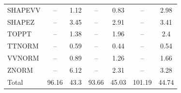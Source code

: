 \begin{table}[H]
\begin{center}
\begin{footnotesize}
\begin{tabular}{lcccccc}
				SHAPEVV & -- &  1.12 & -- &  0.83 & -- &  2.98 \\
				SHAPEZ & -- &  3.45 & -- &  2.91 & -- &  3.41 \\
				TOPPT & -- &  1.38 & -- &  1.96 & -- &  2.4 \\
				TTNORM & -- &  0.59 & -- &  0.44 & -- &  0.54 \\
				VVNORM & -- &  0.89 & -- &  1.26 & -- &  1.66 \\
				ZNORM & -- &  6.12 & -- &  2.31 & -- &  3.28 \\
				Total &  96.16  &  43.3 &  93.66  &  45.03 &  101.19  &  44.74 \\ \hline \hline
			\end{tabular}
			\label{tab:SysUncertainties_2600}
        \end{footnotesize}
	\end{center}
\end{table}


